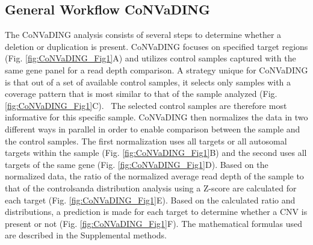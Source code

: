 \subsection{General Workflow CoNVaDING}
The CoNVaDING analysis consists of several steps to determine whether a deletion or duplication is present. 
CoNVaDING focuses on specified target regions (Fig. \ref{fig:CoNVaDING_Fig1}A) and utilizes control samples captured with the same gene panel for a read depth comparison. 
A strategy unique for CoNVaDING is that out of a set of available control samples, it selects only samples with a coverage pattern that is most similar to that of the sample analyzed (Fig. \ref{fig:CoNVaDING_Fig1}C). \
The selected control samples are therefore most informative for this specific sample. 
CoNVaDING then normalizes the data in two different ways in parallel in order to enable comparison between the sample and the control samples. The first normalization uses all targets or all autosomal targets within the sample (Fig. \ref{fig:CoNVaDING_Fig1}B) and the second uses all targets of the same gene (Fig. \ref{fig:CoNVaDING_Fig1}D). 
Based on the normalized data, the ratio of the normalized average read depth of the sample to that of the controlsanda distribution analysis using a Z-score are calculated for each target (Fig. \ref{fig:CoNVaDING_Fig1}E). 
Based on the calculated ratio and distributions, a prediction is made for each target to determine whether a CNV is present or not (Fig. \ref{fig:CoNVaDING_Fig1}F). 
The mathematical formulas used are described in the Supplemental methods.


